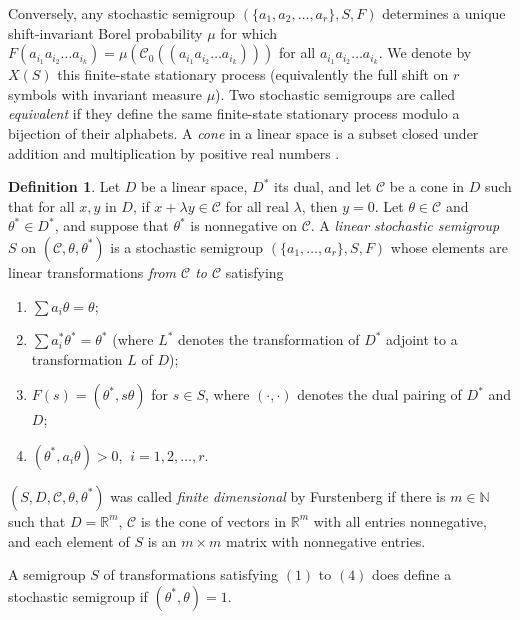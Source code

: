 \documentclass{kepart2010}
\theoremstyle{plain}
\theoremstyle{definition}
\newtheorem{defn}[thm]{Definition}
\theoremstyle{remark}
\theoremstyle{definition}
\numberwithin{equation}{section}
\begin{document}
Conversely,  any stochastic semigroup $(\{ a_1, a_2, \dots ,
a_r\},S,F)$ determines a unique shift-invariant Borel probability
$\mu$ for which $F(a_{i_1}a_{i_2}\dots  a_{i_k})=
\mu({{\mathcal C}}_0((a_{i_1}a_{i_2}\dots   a_{i_k})))$ for all
$a_{i_1}a_{i_2}\dots a_{i_k}$. We denote by $X(S)$ this finite-state
stationary process (equivalently the full shift on $r$ symbols with
invariant measure $\mu$). Two stochastic semigroups are called {\it
equivalent} if they define the same finite-state stationary process
modulo a bijection of their alphabets. A {\em cone} in a linear
space is a subset closed under addition and multiplication by
positive real numbers \cite[Sec. 15.1]{Furstenberg1960}.

\begin{defn}\label{defn_linearsemigp} \cite[Definition 19.1]{Furstenberg1960}
Let $D$ be a linear space, $D^*$ its dual, and let ${{\mathcal C}}$ be a cone
in $D$ such that for all $x,y$ in $D$, if $x+\lambda y \in {{\mathcal C}}$ for
all real $\lambda$, then $y=0$. Let $\theta\in {{\mathcal C}}$ and $\theta^*\in
D^*$, and suppose that  $\theta^*$ is nonnegative on ${{\mathcal C}}$. A {\it
linear stochastic semigroup } $S$ on $({{\mathcal C}}, \theta,\theta^*)$ is a
stochastic semigroup $(\{a_1,\dots,a_r\},S,F)$ whose elements are
linear transformations {\em from ${{\mathcal C}}$ to ${{\mathcal C}}$} satisfying
\begin{enumerate}
\item
$\sum a_i \theta = \theta$;
\item
$\sum a_i^* \theta^* = \theta^*$ (where $L^*$ denotes the
transformation of $D^*$ adjoint to a transformation $L$ of $D$);
\item
$F(s)= (\theta^*,s\theta )$ for  $s \in S$, where $(\cdot , \cdot )$
denotes the dual pairing of $D^*$ and $D$;
\item
$(\theta^*,a_i \theta) > 0$, $\ i=1,2, \dots , r$.
\end{enumerate}
$(S,D,{{\mathcal C}},\theta,\theta^*)$ was called {\em finite dimensional} by
Furstenberg if there is $m \in {\mathbb N}$ such that $D={\mathbb R}^m$, ${{\mathcal C}}$ is
the cone of vectors in ${\mathbb R}^m$ with all entries nonnegative, and
each element of $S$ is an $m \times m$ matrix with nonnegative
entries.
\end{defn}

A semigroup $S$ of transformations satisfying $(1)$ to $(4)$ does
define a stochastic semigroup if $(\theta^*,\theta) = 1$.
\end{document}
